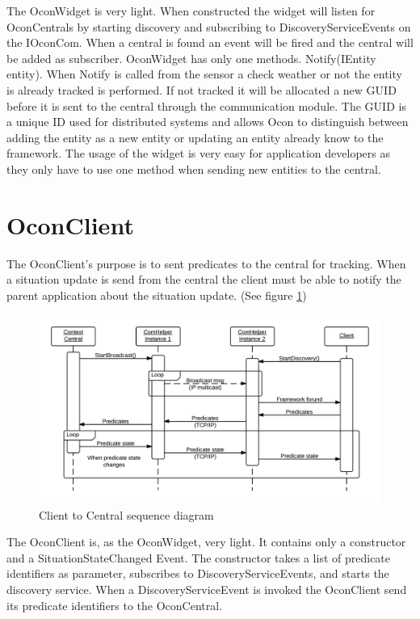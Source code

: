 \documentclass[../report.tex]{subfiles}
\begin{document}
The OconWidget is very light. When constructed the widget will listen for OconCentrals by starting discovery and subscribing to DiscoveryServiceEvents on the IOconCom. When a central is found an event will be fired and the central will be added as subscriber. OconWidget has only one methods. Notify(IEntity entity). When Notify is called from the sensor a check weather or not the entity is already tracked is performed. If not tracked it will be allocated a new GUID before it is sent to the central through the communication module. The GUID is a unique ID used for distributed systems and allows Ocon to distinguish between adding the entity as a new entity or updating an entity already know to the framework. The usage of the widget is very easy for application developers as they only have to use one method when sending new entities to the central.

\section{OconClient}
The OconClient's purpose is to sent predicates to the central for tracking. When a situation update is send from the central the client must be able to notify the parent application about the situation update. (See figure \ref{fig:clientComHelper})

\begin{figure}
\hspace{-70px}
\includegraphics[width=500px]{comHelperSequence-client.png}
\caption{Client to Central sequence diagram}
\label{fig:clientComHelper}
\end{figure}

The OconClient is, as the OconWidget, very light. It contains only a constructor and a SituationStateChanged Event. The constructor takes a list of predicate identifiers as parameter, subscribes to DiscoveryServiceEvents, and starts the discovery service. When a DiscoveryServiceEvent is invoked the OconClient send its predicate identifiers to the OconCentral.
\end{document}
